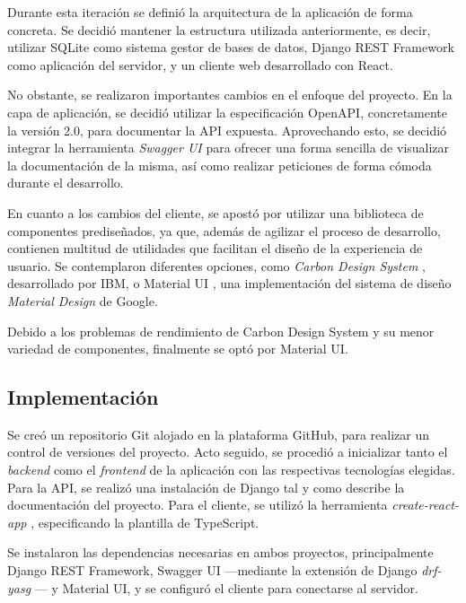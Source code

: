 \documentclass[10pt, a4paper]{aqademic}
\begin{document}
Durante esta iteración se definió la arquitectura de la aplicación de forma concreta. Se decidió mantener la estructura utilizada anteriormente, es decir, utilizar SQLite como sistema gestor de bases de datos, Django REST Framework como aplicación del servidor, y un cliente web desarrollado con React. 

No obstante, se realizaron importantes cambios en el enfoque del proyecto. En la capa de aplicación, se decidió utilizar la especificación OpenAPI, concretamente la versión 2.0, para documentar la API expuesta. Aprovechando esto, se decidió integrar la herramienta \textit{Swagger UI} para ofrecer una forma sencilla de visualizar la documentación de la misma, así como realizar peticiones de forma cómoda durante el desarrollo.

En cuanto a los cambios del cliente, se apostó por utilizar una biblioteca de componentes prediseñados, ya que, además de agilizar el proceso de desarrollo, contienen multitud de utilidades que facilitan el diseño de la experiencia de usuario. Se contemplaron diferentes opciones, como \textit{Carbon Design System} \cite{noauthor_carbon_nodate}, desarrollado por IBM, o Material UI \cite{noauthor_material-ui:_nodate}, una implementación del sistema de diseño \textit{Material Design} \cite{noauthor_material_nodate} de Google. 

Debido a los problemas de rendimiento de Carbon Design System y su menor variedad de componentes, finalmente se optó por Material UI.

\subsection{Implementación}

Se creó un repositorio Git alojado en la plataforma GitHub, para realizar un control de versiones del proyecto. Acto seguido, se procedió a inicializar tanto el \textit{backend} como el \textit{frontend} de la aplicación con las respectivas tecnologías elegidas. Para la API, se realizó una instalación de Django tal y como describe la documentación \cite{noauthor_how_nodate} del proyecto. Para el cliente, se utilizó la herramienta \textit{create-react-app} \cite{noauthor_create_nodate}, especificando la plantilla de TypeScript.

Se instalaron las dependencias necesarias en ambos proyectos, principalmente Django REST Framework, Swagger UI ---mediante la extensión de Django \textit{drf-yasg} \cite{vijdea_drf-yasg_nodate}--- y Material UI, y se configuró el cliente para conectarse al servidor.
\end{document}
